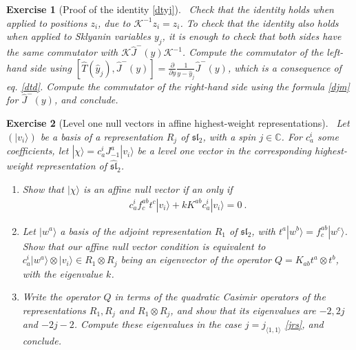 \documentclass[12pt, a4paper, notitlepage, twoside]{report}
\numberwithin{equation}{section}
\theoremstyle{break}
\newtheorem{exo}{Exercise}[chapter]
\begin{document}
\begin{exo}[Proof of the identity \eqref{dtyj}]
 ~\label{exoktk}
Check that the identity holds when applied to positions $z_i$, due to $\mathcal{K}^{-1}z_i = z_i$. 
To check that the identity also holds when applied to Sklyanin variables $y_j$, it is enough to check 
that both sides have the same commutator with $\mathcal{K}\hat{J}^-(y)\mathcal{K}^{-1}$. 
Compute the commutator of the left-hand side using $[\hat{T}(\hat{y}_j),\hat{J}^-(y)]={\frac{\partial}{\partial y}}\frac{1}{y-\hat{y}_j}\hat{J}^-(y)$, which is a consequence of eq. \eqref{dtd}.
Compute the commutator of the 
right-hand side using the formula \eqref{djm} for $\hat{J}^-(y)$, and conclude.
\end{exo}

\begin{exo}[Level one null vectors in affine highest-weight representations]
 ~\label{exolos}
 Let $(|v_i\rangle)$ be a basis of a representation $R_j$ of $\mathfrak{sl}_2$, with a spin $j\in\mathbb{C}$. For $c_a^i$ some coefficients, let $|\chi\rangle =  c_a^i J_{-1}^a|v_i\rangle$ be a level one vector in the corresponding highest-weight representation of $\widehat{\mathfrak{sl}}_2$.
 \begin{enumerate}
  \item Show that $|\chi \rangle $ is an affine null vector if an only if 
  \begin{align}
    c_a^i f^{ab}_c t^c|v_i\rangle + k K^{ab} c_a^i |v_i\rangle = 0\ .
  \end{align}
  \item Let $|w^a\rangle$ a basis of the adjoint representation $R_1$ of $\mathfrak{sl}_2$, with $t^a|w^b\rangle = f^{ab}_c|w^c\rangle$. Show that our affine null vector condition is equivalent to $c_a^i|w^a\rangle\otimes |v_i\rangle\in R_1\otimes R_j$ being an eigenvector of the operator $Q=K_{ab}t^a\otimes t^b$, with the eigenvalue $k$.
  \item Write the operator $Q$ in terms of the quadratic Casimir operators of the representations $R_1, R_j$ and $R_1\otimes R_j$, and show that its eigenvalues are $-2, 2j$ and $-2j-2$. 
  Compute these eigenvalues in the case $j=j_{\langle 1,1\rangle}$ \eqref{jrs}, and conclude.
 \end{enumerate}
\end{exo}
\end{document}
